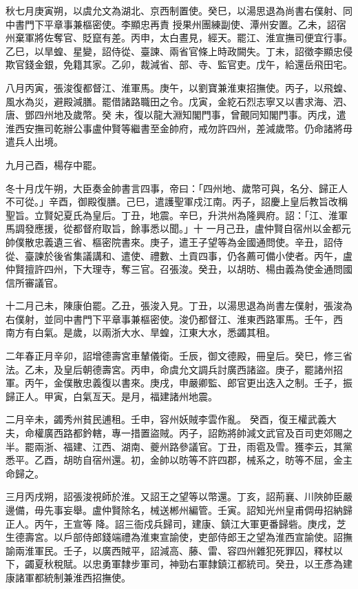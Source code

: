 \begin{pinyinscope}
 秋七月庚寅朔，以虞允文為湖北、京西制置使。癸巳，以湯思退為尚書右僕射、同中書門下平章事兼樞密使。李顯忠再責
 授果州團練副使、潭州安置。乙未，詔宿州棄軍將佐奪官、貶竄有差。丙申，太白晝見，經天。罷江、淮宣撫司便宜行事。乙巳，以旱蝗、星變，詔侍從、臺諫、兩省官條上時政闕失。丁未，詔徵李顯忠侵欺官錢金銀，免籍其家。乙卯，裁減省、部、寺、監官吏。戊午，給還岳飛田宅。



 八月丙寅，張浚復都督江、淮軍馬。庚午，以劉寶兼淮東招撫使。丙子，以飛蝗、風水為災，避殿減膳。罷借諸路職田之令。戊寅，金紇石烈志寧又以書求海、泗、唐、鄧四州地及歲幣。癸
 未，復以龍大淵知閣門事，曾覿同知閣門事。丙戌，遣淮西安撫司乾辦公事盧仲賢等繼書至金帥府，戒勿許四州，差減歲幣。仍命諸將毋遣兵人出境。



 九月己酉，楊存中罷。



 冬十月戊午朔，大臣奏金帥書言四事，帝曰：「四州地、歲幣可與，名分、歸正人不可從。」辛酉，御殿復膳。己巳，遣護聖軍戍江南。丙子，詔慶上皇后教旨改稱聖旨。立賢妃夏氏為皇后。丁丑，地震。辛巳，升洪州為隆興府。詔：「江、淮軍馬調發應援，從都督府取旨，餘事悉以聞。」十
 一月己丑，盧仲賢自宿州以金都元帥僕散忠義遺三省、樞密院書來。庚子，遣王子望等為金國通問使。辛丑，詔侍從、臺諫於後省集議講和、遣使、禮數、土貢四事，仍各薦可備小使者。丙午，盧仲賢擅許四州，下大理寺，奪三官。召張浚。癸丑，以胡昉、楊由義為使金通問國信所審議官。



 十二月己未，陳康伯罷。乙丑，張浚入見。丁丑，以湯思退為尚書左僕射，張浚為右僕射，並同中書門下平章事兼樞密使。浚仍都督江、淮東西路軍馬。壬午，西
 南方有白氣。是歲，以兩浙大水、旱蝗，江東大水，悉蠲其租。



 二年春正月辛卯，詔增德壽宮車輦儀衛。壬辰，御文德殿，冊皇后。癸巳，修三省法。乙未，及皇后朝德壽宮。丙申，命虞允文調兵討廣西諸盜。庚子，罷諸州招軍。丙午，金僕散忠義復以書來。庚戌，申嚴卿監、郎官更出迭入之制。壬子，振歸正人。甲寅，白氣亙天。是月，福建諸州地震。



 二月辛未，蠲秀州貧民逋租。壬申，容州妖賊李雲作亂。
 癸酉，復王權武義大夫，命權廣西路都鈐轄，專一措置盜賊。丙子，詔飭將帥減文武官及百司吏郊賜之半。罷兩浙、福建、江西、湖南、夔州路參議官。丁丑，雨雹及雪。獲李云，其黨悉平。乙酉，胡昉自宿州還。初，金帥以昉等不許四郡，械系之，昉等不屈，金主命歸之。



 三月丙戌朔，詔張浚視師於淮。又詔王之望等以幣還。丁亥，詔荊襄、川陜帥臣嚴邊備，毋先事妄舉。盧仲賢除名，械送郴州編管。壬寅。詔知光州皇甫倜毋招納歸正人。丙午，王宣等
 降。詔三衙戍兵歸司，建康、鎮江大軍更番歸砦。庚戌，芝生德壽宮。以戶部侍郎錢端禮為淮東宣諭使，吏部侍郎王之望為淮西宣諭使。詔撫諭兩淮軍民。壬子，以廣西賊平，詔減高、藤、雷、容四州雜犯死罪囚，釋杖以下，蠲夏秋稅賦。以忠勇軍隸步軍司，神勁右軍隸鎮江都統司。癸丑，以王彥為建康諸軍都統制兼淮西招撫使。




\end{pinyinscope}
